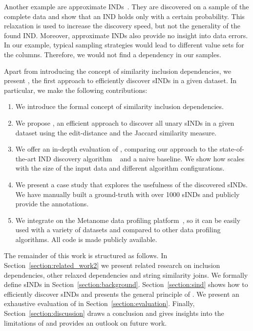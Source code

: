 Another example are approximate INDs~\cite{FAIDA}.
They are discovered on a sample of the complete data and show that an IND holds only with a certain probability.
This relaxation is used to increase the discovery speed, but not the generality of the found IND\@.
Moreover, approximate INDs also provide no insight into data errors.
In our example, typical sampling strategies would lead to different value sets for the columns.
Therefore, we would not find a dependency in our samples.


Apart from introducing the concept of similarity inclusion dependencies, we present \textbf{\sawfish}, the first approach to efficiently discover sINDs in a given dataset. In particular, we make the following contributions:
\begin{enumerate}
  \item We introduce the formal concept of similarity inclusion dependencies.
  \item We propose \sawfish, an efficient approach to discover all unary sINDs in a given dataset using the edit-distance and the Jaccard similarity measure.
  \item We offer an in-depth evaluation of \sawfish, comparing our approach to the state-of-the-art IND discovery algorithm ~\cite{papenbrock2015divide} and a naive baseline.
  We show how \sawfish scales with the size of the input data and different algorithm configurations.
  \item We present a case study that explores the usefulness of the discovered sINDs. We have manually built a ground-truth with over \num{1000} sINDs and publicly provide the annotations.
  \item We integrate \sawfish on the Metanome data profiling platform~\cite{papenbrock2015metanome}, so it can be easily used with a variety of datasets and compared to other data profiling algorithms. All code is made publicly available.
\end{enumerate}
The remainder of this work is structured as follows.
In Section~\ref{section:related_work2} we present related research on inclusion dependencies, other relaxed dependencies and string similarity joins. 
We formally define sINDs in Section~\ref{section:background}.
Section~\ref{section:sind} shows how to efficiently discover sINDs and presents the general principle of \sawfish.
We present an exhaustive evaluation of \sawfish in Section~\ref{section:evaluation}. 
Finally, Section~\ref{section:discussion} draws a conclusion and gives insights into the limitations of \sawfish and provides an outlook on future work.